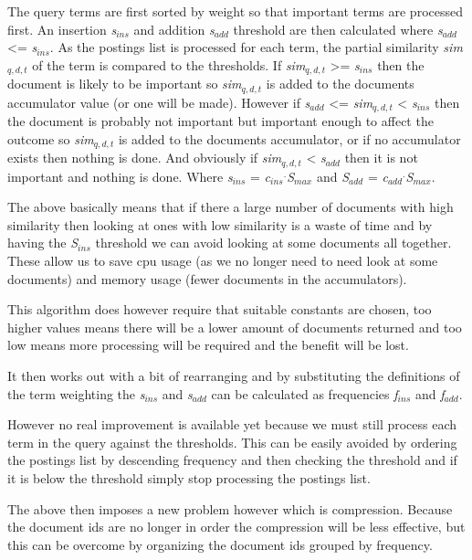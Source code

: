 \documentclass{acm_proc_article-sp}
\begin{document}
The query terms are first sorted by weight so that important terms are processed first. An insertion \emph{s$_{ins}$} and addition \emph{s$_{add}$} threshold are then calculated where \emph{s$_{add}$} <= \emph{s$_{ins}$}. As the postings list is processed for each term, the partial similarity \emph{sim$_{q,d,t}$} of the term is compared to the thresholds. If \emph{sim$_{q,d,t}$} >= \emph{s$_{ins}$} then the document is likely to be important so \emph{sim$_{q,d,t}$} is added to the documents accumulator value (or one will be made). However if \emph{s$_{add}$} <= \emph{sim$_{q,d,t}$} < \emph{s$_{ins}$} then the document is probably not important but important enough to affect the outcome so \emph{sim$_{q,d,t}$} is added to the documents accumulator, or if no accumulator exists then nothing is done. And obviously if \emph{sim$_{q,d,t}$} < \emph{s$_{add}$} then it is not important and nothing is done. Where \emph{s$_{ins}$} = \emph{c$_{ins}$$^{.}$S$_{max}$} and \emph{S$_{add}$} = \emph{c$_{add}$$^{.}$S$_{max}$}.

The above basically means that if there a large number of documents with high similarity then looking at ones with low similarity is a waste of time and by having the \emph{S$_{ins}$} threshold we can avoid looking at some documents all together. These allow us to save cpu usage (as we no longer need to need look at some documents) and memory usage (fewer documents in the accumulators).

This algorithm does however require that suitable constants are chosen, too higher values means there will be a lower amount of documents returned and too low means more processing will be required and the benefit will be lost. 

It then works out with a bit of rearranging and by substituting the definitions of the term weighting the \emph{s$_{ins}$} and \emph{s$_{add}$} can be calculated as frequencies \emph{f$_{ins}$} and \emph{f$_{add}$}.

However no real improvement is available yet because we must still process each term in the query against the thresholds. This can be easily avoided by ordering the postings list by descending frequency and then checking the threshold and if it is below the threshold simply stop processing the postings list.

The above then imposes a new problem however which is compression. Because the document ids are no longer in order the compression will be less effective, but this can be overcome by organizing the document ids grouped by frequency.
\end{document}
